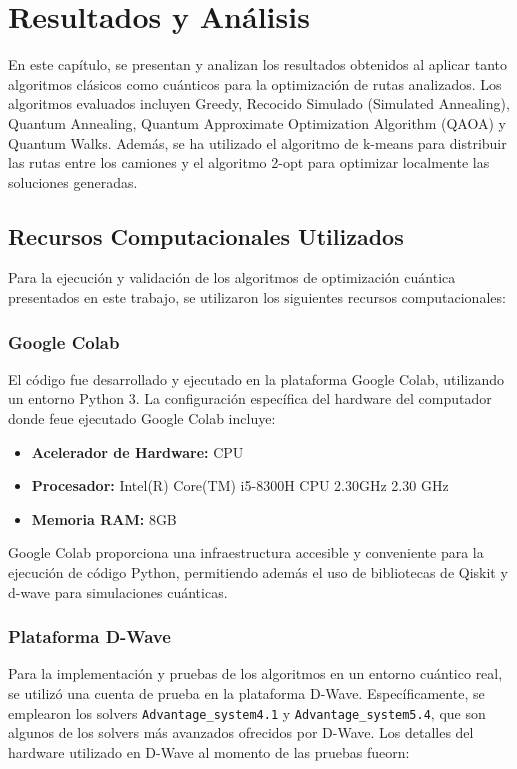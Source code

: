 \documentclass[11pt,a4paper,spanish]{book}
\begin{document}
\chapter{Resultados y Análisis}

En este capítulo, se presentan y analizan los resultados obtenidos al aplicar tanto algoritmos clásicos como cuánticos para la optimización de rutas analizados. Los algoritmos evaluados incluyen Greedy, Recocido Simulado (Simulated Annealing), Quantum Annealing, Quantum Approximate Optimization Algorithm (QAOA) y Quantum Walks. Además, se ha utilizado el algoritmo de k-means para distribuir las rutas entre los camiones y el algoritmo 2-opt para optimizar localmente las soluciones generadas.


\section{Recursos Computacionales Utilizados}

Para la ejecución y validación de los algoritmos de optimización cuántica presentados en este trabajo, se utilizaron los siguientes recursos computacionales:

\subsection{Google Colab}

El código fue desarrollado y ejecutado en la plataforma Google Colab, utilizando un entorno Python 3. La configuración específica del hardware del computador donde feue ejecutado Google Colab incluye:

\begin{itemize}
    \item \textbf{Acelerador de Hardware:} CPU
    \item \textbf{Procesador:} Intel(R) Core(TM) i5-8300H CPU \@ 2.30GHz 2.30 GHz
    \item \textbf{Memoria RAM:} 8GB
\end{itemize}

Google Colab proporciona una infraestructura accesible y conveniente para la ejecución de código Python, permitiendo además el uso de bibliotecas de Qiskit y d-wave para simulaciones cuánticas.

\subsection{Plataforma D-Wave}

Para la implementación y pruebas de los algoritmos en un entorno cuántico real, se utilizó una cuenta de prueba en la plataforma D-Wave. Específicamente, se emplearon los solvers \texttt{Advantage\_system4.1} y \texttt{Advantage\_system5.4}, que son algunos de los solvers más avanzados ofrecidos por D-Wave. Los detalles del hardware utilizado en D-Wave al momento de las pruebas fueorn:
\end{document}
